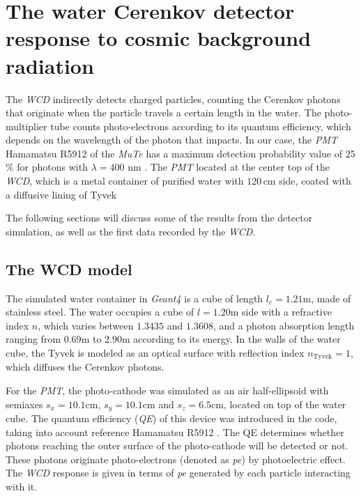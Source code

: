 \documentclass[submitting]{nst}
\begin{document}
\section{The water Cerenkov detector response to cosmic background radiation}
\label{sec:wcd-response}
The \textsl{WCD} indirectly detects charged particles, counting the Cerenkov photons that originate when the particle travels a certain length in the water. The photo-multiplier tube counts photo-electrons according to its quantum efficiency, which depends on the wavelength of the photon that impacts.  In our case, the \textsl{PMT} Hamamatsu R5912 of the \textsl{MuTe} has a maximum detection probability value of $25$\% for photons with $\lambda = 400$ nm \cite{Hamamatsu2018}. The \textsl{PMT} located at the center top of the \textsl{WCD}, which is a metal container of purified water with $120$\,cm side, coated with a diffusive lining of Tyvek 

The following sections will discuss some of the results from the detector simulation, as well as the first data recorded by the  \textsl{WCD}.

\subsection{The WCD model}\label{sec:wcd-model}
The simulated water container in \textsl{Geant4} is a cube of length $l_c=1.21$m, made of stainless steel. The water occupies a cube of $ l=1.20$m side with a refractive index $n$, which varies between $1.3435$ and $1.3608$, and a photon absorption length ranging from $0.69$m to $2.90$m according to its energy. In the walls of the water cube, the Tyvek is modeled as an optical surface with reflection index $n_{\mathrm{Tyvek}} = 1 $, which diffuses the Cerenkov photons.

For the \textsl{PMT}, the photo-cathode was simulated as an air half-ellipsoid with semiaxes $s_x=10.1$cm, $ s_y = 10.1$cm and $s_z=6.5$cm, located on top of the water cube. The quantum efficiency (\textsl{QE}) of this device was introduced in the code, taking into account reference Hamamatsu R5912 \cite{Hamamatsu2018}. The QE determines whether photons reaching the outer surface of the photo-cathode will be detected or not. These photons originate photo-electrons (denoted as \textsl{pe}) by photoelectric effect. The \textsl{WCD} response  is given in terms of \textsl{pe} generated by each particle interacting with it.
\end{document}
